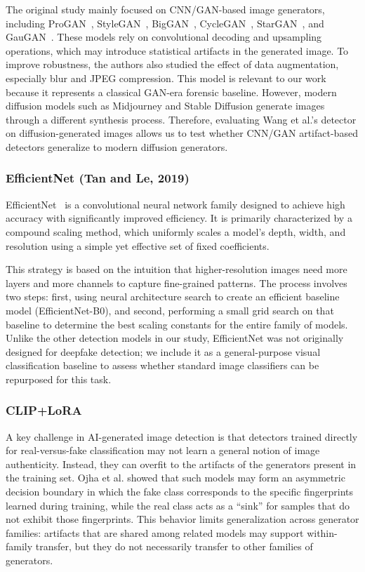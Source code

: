 The original study mainly focused on CNN/GAN-based image generators, including ProGAN~\cite{karras2017progressive}, StyleGAN~\cite{karras2019style}, BigGAN~\cite{brock2018large}, CycleGAN~\cite{zhu2017unpaired}, StarGAN~\cite{choi2018stargan}, and GauGAN~\cite{park2019semantic}. These models rely on convolutional decoding and upsampling operations, which may introduce statistical artifacts in the generated image. To improve robustness, the authors also studied the effect of data augmentation, especially blur and JPEG compression.
This model is relevant to our work because it represents a classical GAN-era forensic baseline. However, modern diffusion models such as Midjourney and Stable Diffusion generate images through a different synthesis process. Therefore, evaluating Wang et al.'s detector on diffusion-generated images allows us to test whether CNN/GAN artifact-based detectors generalize to modern diffusion generators.

\subsubsection{EfficientNet (Tan and Le, 2019)}
\label{subsubsec:efficientnet}
EfficientNet~\cite{tan2019efficientnet} is a convolutional neural network family designed to achieve high accuracy with significantly improved efficiency. It is primarily characterized by a compound scaling method, which uniformly scales a model's depth, width, and resolution using a simple yet effective set of fixed coefficients.

This strategy is based on the intuition that higher-resolution images need more layers and more channels to capture fine-grained patterns. The process involves two steps: first, using neural architecture search to create an efficient baseline model (EfficientNet-B0), and second, performing a small grid search on that baseline to determine the best scaling constants for the entire family of models. Unlike the other detection models in our study, EfficientNet was not originally designed for deepfake detection; we include it as a general-purpose visual classification baseline to assess whether standard image classifiers can be repurposed for this task.

\subsubsection{CLIP+LoRA}
\label{subsubsec:clip-lora}

A key challenge in AI-generated image detection is that detectors trained directly for real-versus-fake classification may not learn a general notion of image authenticity. Instead, they can overfit to the artifacts of the generators present in the training set. Ojha et al. \cite{ojha2023universal} showed that such models may form an asymmetric decision boundary in which the fake class corresponds to the specific fingerprints learned during training, while the real class acts as a ``sink'' for samples that do not exhibit those fingerprints. This behavior limits generalization across generator families: artifacts that are shared among related models may support within-family transfer, but they do not necessarily transfer to other families of generators.

